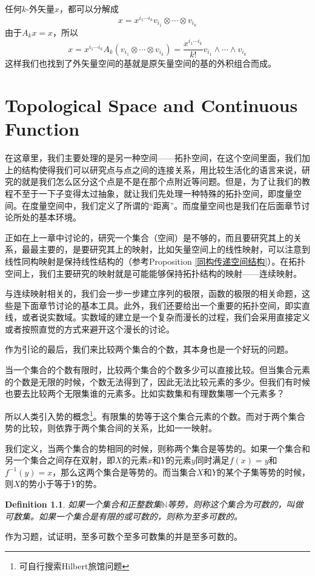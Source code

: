 \documentclass[11pt,a4paper,openany]{book}%
\theoremstyle{plain}%
\newtheorem{defi}{Definition}[chapter]%
\begin{document}
任何$k$-外矢量$x$，都可以分解成
\[
x=x^{i_1\cdots i_k}v_{i_1} \otimes \cdots \otimes v_{i_k}
\]
由于$A_kx=x$，所以
\[
x=x^{i_1\cdots i_k}A_k(v_{i_1} \otimes \cdots \otimes v_{i_k})=\frac{x^{i_1\cdots i_k}}{k!}v_{i_1} \wedge \cdots \wedge v_{i_k}
\]
这样我们也找到了外矢量空间的基就是原矢量空间的基的外积组合而成。

\chapter{Topological Space and Continuous Function}
在这章里，我们主要处理的是另一种空间——拓扑空间，在这个空间里面，我们加上的结构使得我们可以研究点与点之间的连接关系，用比较生活化的语言来说，研究的就是我们怎么区分这个点是不是在那个点附近等问题。但是，为了让我们的教程不至于一下子变得太过抽象，就让我们先处理一种特殊的拓扑空间，即度量空间。在度量空间中，我们定义了所谓的“距离”。而度量空间也是我们在后面章节讨论所处的基本环境。

正如在上一章中讨论的，研究一个集合（空间）是不够的，而且要研究其上的关系，最最主要的，是要研究其上的映射，比如矢量空间上的线性映射，可以注意到线性同构映射是保持线性结构的（参考Proposition \ref{同构传递空间结构}）。在拓扑空间上，我们主要研究的映射就是可能能够保持拓扑结构的映射——连续映射。

与连续映射相关的，我们会一步一步建立序列的极限，函数的极限的相关命题，这些是下面章节讨论的基本工具。此外，我们还要给出一个重要的拓扑空间，即实直线，或者说实数域。实数域的建立是一个复杂而漫长的过程，我们会采用直接定义或者按照直觉的方式来避开这个漫长的讨论。

作为引论的最后，我们来比较两个集合的个数，其本身也是一个好玩的问题。

当一个集合的个数有限时，比较两个集合的个数多少可以直接比较。但当集合元素的个数是无限的时候，个数无法得到了，因此无法比较元素的多少。但我们有时候也要去比较两个无限集谁的元素多。比如实数集和有理数集哪一个元素多？

所以人类引入势的概念\footnote{可自行搜索Hilbert旅馆问题}。有限集的势等于这个集合元素的个数。而对于两个集合势的比较，则依靠于两个集合间的关系，比如一一映射。

我们定义，当两个集合的势相同的时候，则称两个集合是等势的。如果一个集合和另一个集合之间存在双射，即$X$的元素$x$和$Y$的元素$y$同时满足$f(x)=y$和$f^{-1}(y)=x$，那么这两个集合是等势的。而当集合$X$和$Y$的某个子集等势的时候，则$X$的势小于等于$Y$的势。
\begin{defi}
如果一个集合和正整数集$\mathbb{N}$等势，则称这个集合为可数的，叫做可数集。如果一个集合是有限的或可数的，则称为至多可数的。
\end{defi}
作为习题，试证明，至多可数个至多可数集的并是至多可数的。
\end{document}
